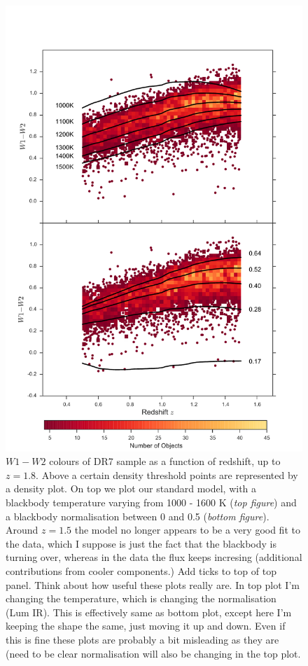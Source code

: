 \begin{figure}
\centering
\includegraphics[width=\columnwidth]{figures/chapter06/w1w2_z_v2}
\caption{$W1 - W2$ colours of DR7 sample as a function of redshift, up to $z=1.8$. Above a certain density threshold points are represented by a density plot. On top we plot our standard model, with a blackbody temperature varying from 1000 - 1600 K ({\it top figure}) and a blackbody normalisation between 0 and 0.5 ({\it bottom figure}). Around $z=1.5$ the model no longer appears to be a very good fit to the data, which I suppose is just the fact that the blackbody is turning over, whereas in the data the flux keeps incresing (additional contributions from cooler components.) Add ticks to top of top panel. Think about how useful these plots really are. In top plot I'm changing the temperature, which is changing the normalisation (Lum IR). This is effectively same as bottom plot, except here I'm keeping the shape the same, just moving it up and down. Even if this is fine these plots are probably a bit misleading as they are (need to be clear normalisation will also be changing in the top plot.}
  \label{fig:w1w2colors}
\end{figure}


